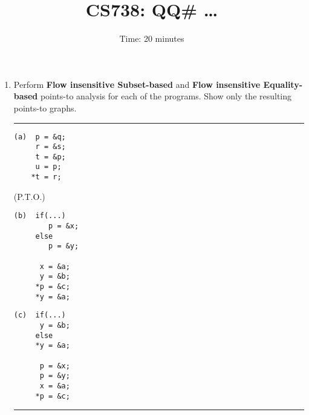 \documentclass[a4paper,11pt]{article}%
\begin{document}
\title{CS738: QQ\# \ldots}
\author{Time: 20 minutes}
\date{}
\maketitle
\begin{enumerate}
\item Perform {\bf Flow insensitive Subset-based} and {\bf
  Flow insensitive Equality-based} points-to analysis for
  each of the programs. Show only the resulting points-to
  graphs.
\hrule
  \begin{verbatim}
(a)  p = &q;
     r = &s;
     t = &p;
     u = p;
    *t = r;
  \end{verbatim}
\vfill \hfill (P.T.O.)
\clearpage
  \begin{verbatim}
(b)  if(...)
        p = &x;
     else
        p = &y;

      x = &a;
      y = &b;
     *p = &c;
     *y = &a;
  \end{verbatim}
\vfill
  \begin{verbatim}
(c)  if(...)
      y = &b;
     else
     *y = &a;

      p = &x;
      p = &y;
      x = &a;
     *p = &c;
  \end{verbatim}
\vfill\mbox{}
\hrule
\end{enumerate}
\end{document}
